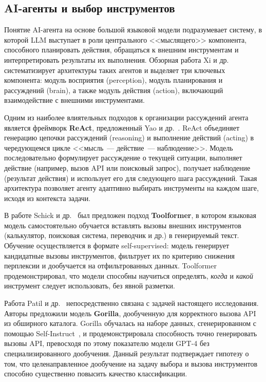 \subsection{AI-агенты и выбор инструментов}

Понятие AI-агента на основе большой языковой модели подразумевает систему, в которой LLM выступает в роли центрального <<мыслящего>> компонента, способного планировать действия, обращаться к внешним инструментам и интерпретировать результаты их выполнения. Обзорная работа Xi и др.~\cite{xi2023rise} систематизирует архитектуры таких агентов и выделяет три ключевых компонента: модуль восприятия (perception), модуль планирования и рассуждений (brain), а также модуль действия (action), включающий взаимодействие с внешними инструментами.

Одним из наиболее влиятельных подходов к организации рассуждений агента является фреймворк \textbf{ReAct}, предложенный Yao и др.~\cite{yao2023react}. ReAct объединяет генерацию цепочки рассуждений (reasoning) и выполнение действий (acting) в чередующемся цикле <<мысль~--- действие~--- наблюдение>>. Модель последовательно формулирует рассуждение о текущей ситуации, выполняет действие (например, вызов API или поисковый запрос), получает наблюдение (результат действия) и использует его для следующего шага рассуждений. Такая архитектура позволяет агенту адаптивно выбирать инструменты на каждом шаге, исходя из контекста задачи.

В работе Schick и др.~\cite{schick2023toolformer} был предложен подход \textbf{Toolformer}, в котором языковая модель самостоятельно обучается вставлять вызовы внешних инструментов (калькулятор, поисковая система, переводчик и др.) в генерируемый текст. Обучение осуществляется в формате self-supervised: модель генерирует кандидатные вызовы инструментов, фильтрует их по критерию снижения перплексии и дообучается на отфильтрованных данных. Toolformer продемонстрировал, что модели способны научиться определять, \textit{когда} и \textit{какой} инструмент следует использовать, без явной разметки.

Работа Patil и др.~\cite{patil2023gorilla} непосредственно связана с задачей настоящего исследования. Авторы предложили модель \textbf{Gorilla}, дообученную для корректного вызова API из обширного каталога. Gorilla обучалась на наборе данных, сгенерированном с помощью Self-Instruct~\cite{wang2023selfinstruct}, и продемонстрировала способность точно генерировать вызовы API, превосходя по этому показателю модели GPT-4 без специализированного дообучения. Данный результат подтверждает гипотезу о том, что целенаправленное дообучение на задачу выбора и вызова инструментов способно существенно повысить качество классификации.

